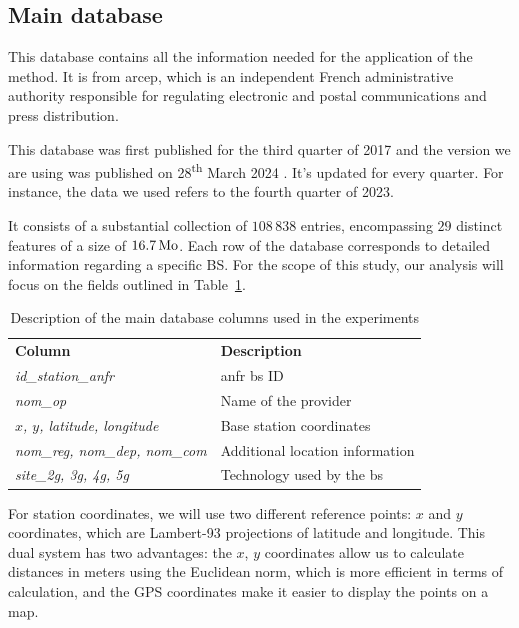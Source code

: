 \documentclass[lettersize,journal,english]{IEEEtran}
\begin{document}
    \subsection{Main database}
        This database \cite{main_database} contains all the information needed for the application of the method. It is from \acrfull{arcep}, which is an independent French administrative authority responsible for regulating electronic and postal communications and press distribution.

        This database was first published for the third quarter of 2017 and the version we are using was published on 28\textsuperscript{th} March 2024 \cite{main_database_hist}.
        It's updated for every quarter. For instance, the data we used refers to the fourth quarter of 2023.

        It consists of a substantial collection of $108\,838$ entries, encompassing $29$ distinct features of a size of $\unit[16.7]{Mo}$.
        Each row of the database corresponds to detailed information regarding a specific BS. For the scope of this study, our analysis will focus on the fields outlined in Table~\ref{table:data_columns}.
        \begin{table}
            \centering
            \caption{Description of the main database columns used in the experiments}
            \label{table:data_columns}
            \begin{tabular}{ll}
                \toprule
                \textbf{Column} & \textbf{Description} \\
                \cmidrule(lr){1-2}
                \textsl{id\_station\_anfr} & \acrshort{anfr} \acrshort{bs} ID \\ 
                \textsl{nom\_op} & Name of the provider \\
                \textsl{$x$, $y$, latitude, longitude} & Base station coordinates \\ 
                \textsl{nom\_reg, nom\_dep, nom\_com} & Additional location information \\  
                \textsl{site\_2g, 3g, 4g, 5g} & Technology used by the \acrshort{bs} \\ 
                \bottomrule
            \end{tabular}
        \end{table}

        For station coordinates, we will use two different reference points: $x$ and $y$ coordinates, which are Lambert-93 projections of latitude and longitude.
        This dual system has two advantages: the $x$, $y$ coordinates allow us to calculate distances in meters using the Euclidean norm, which is more efficient in terms of calculation, and the GPS coordinates make it easier to display the points on a map.
\end{document}
